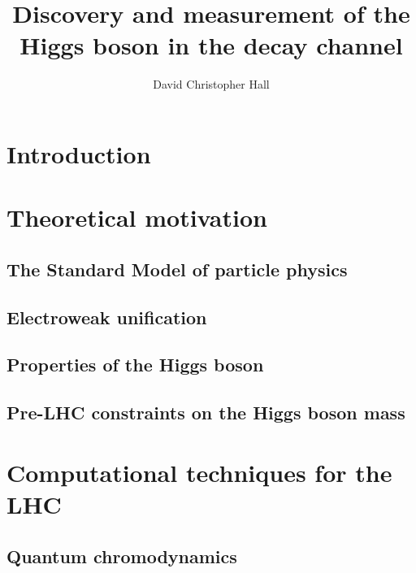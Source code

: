 \documentclass[hyper,linkcolor=blue]{mythesis}
\title{Discovery and measurement of the Higgs boson in the \WW decay channel}
\author{David Christopher Hall}
\begin{document}
\begin{frontmatter}
  
\end{frontmatter}

\begin{mainmatter}
  \cleardoublepage
  \listoftodos
  
  
  \chapter*{Introduction}
    \label{chap:intro}
    

  \chapter{Theoretical motivation}
    \label{chap:motivation}
    
    \section{The Standard Model of particle physics}
      \label{sec:sm}
      
    \section{Electroweak unification}
      \label{sec:ewsb}
      
    \section{Properties of the Higgs boson}
      \label{sec:properties}
      
    \section{Pre-LHC constraints on the Higgs boson mass}
      \label{sec:prior_constraints}
      

  \chapter{Computational techniques for the LHC}
    \label{chap:tools}
    
    \section{Quantum chromodynamics}
      \label{sec:qcd}
      

\end{mainmatter}
\end{document}
